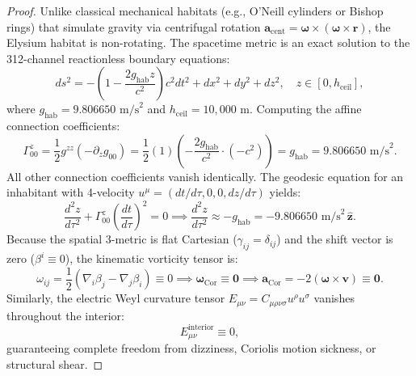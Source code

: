 \documentclass[11pt,onecolumn]{article}
\begin{document}
\begin{proof}
Unlike classical mechanical habitats (e.g., O'Neill cylinders or Bishop rings) that simulate gravity via centrifugal rotation $\mathbf{a}_{\text{cent}} = \boldsymbol{\omega} \times (\boldsymbol{\omega} \times \mathbf{r})$, the Elysium habitat is non-rotating. The spacetime metric is an exact solution to the 312-channel reactionless boundary equations:
\begin{equation}
ds^2 = -\left( 1 - \frac{2 g_{\text{hab}} z}{c^2} \right) c^2 dt^2 + dx^2 + dy^2 + dz^2, \quad z \in [0, h_{\text{ceil}}],
\end{equation}
where $g_{\text{hab}} = 9.806650\text{ m/s}^2$ and $h_{\text{ceil}} = 10{,}000\text{ m}$. Computing the affine connection coefficients:
\begin{equation}
\Gamma^z_{00} = \frac{1}{2} g^{zz} \left( -\partial_z g_{00} \right) = \frac{1}{2} (1) \left( -\frac{2 g_{\text{hab}}}{c^2} \cdot (-c^2) \right) = g_{\text{hab}} = 9.806650\text{ m/s}^2.
\end{equation}
All other connection coefficients vanish identically. The geodesic equation for an inhabitant with 4-velocity $u^\mu = (dt/d\tau, 0, 0, dz/d\tau)$ yields:
\begin{equation}
\frac{d^2 z}{d\tau^2} + \Gamma^z_{00} \left( \frac{dt}{d\tau} \right)^2 = 0 \implies \frac{d^2 z}{d\tau^2} \approx -g_{\text{hab}} = -9.806650\text{ m/s}^2\,\hat{\mathbf{z}}.
\end{equation}
Because the spatial 3-metric is flat Cartesian ($\gamma_{ij} = \delta_{ij}$) and the shift vector is zero ($\beta^i \equiv 0$), the kinematic vorticity tensor is:
\begin{equation}
\omega_{ij} = \frac{1}{2} (\nabla_i \beta_j - \nabla_j \beta_i) \equiv 0 \implies \boldsymbol{\omega}_{\text{Cor}} \equiv \mathbf{0} \implies \mathbf{a}_{\text{Cor}} = -2(\boldsymbol{\omega} \times \mathbf{v}) \equiv \mathbf{0}.
\end{equation}
Similarly, the electric Weyl curvature tensor $E_{\mu\nu} = C_{\mu\rho\nu\sigma} u^\rho u^\sigma$ vanishes throughout the interior:
\begin{equation}
E_{\mu\nu}^{\text{interior}} \equiv 0,
\end{equation}
guaranteeing complete freedom from dizziness, Coriolis motion sickness, or structural shear.


\end{proof}
\end{document}
